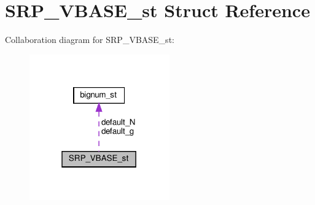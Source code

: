 \hypertarget{structSRP__VBASE__st}{}\section{S\+R\+P\+\_\+\+V\+B\+A\+S\+E\+\_\+st Struct Reference}
\label{structSRP__VBASE__st}


Collaboration diagram for S\+R\+P\+\_\+\+V\+B\+A\+S\+E\+\_\+st\+:
\nopagebreak
\begin{figure}[H]
\begin{center}
\leavevmode
\includegraphics[width=171pt]{structSRP__VBASE__st__coll__graph}
\end{center}
\end{figure}
